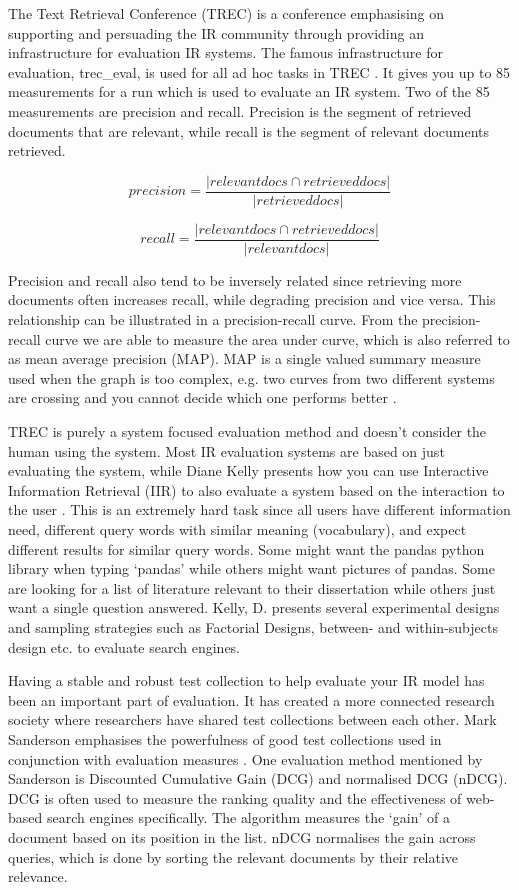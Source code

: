 The Text Retrieval Conference (TREC) is a conference emphasising on supporting and persuading the IR community through providing an infrastructure for evaluation IR systems. The famous infrastructure for evaluation, trec\_eval, is used for all ad hoc tasks in TREC \cite{voorhees:evaluation}. It gives you up to 85 measurements for a run which is used to evaluate an IR system. Two of the 85 measurements are precision and recall. Precision is the segment of retrieved documents that are relevant, while recall is the segment of relevant documents retrieved.

$$ precision = \frac{|{relevant docs} \cap {retrieved docs}|}{|{retrieved docs}|} $$

$$ recall = \frac{|{relevant docs} \cap {retrieved docs}|}{|{relevant docs}|} $$

Precision and recall also tend to be inversely related since retrieving more documents often increases recall, while degrading precision and vice versa\cite{voorhees:evaluation}. This relationship can be illustrated in a precision-recall curve. From the precision-recall curve we are able to measure the area under curve, which is also referred to as mean average precision (MAP). MAP is a single valued summary measure used when the graph is too complex, e.g. two curves from two different systems are crossing and you cannot decide which one performs better \cite{voorhees:evaluation}.

TREC is purely a system focused evaluation method and doesn’t consider the human using the system. Most IR evaluation systems are based on just evaluating the system, while Diane Kelly presents how you can use Interactive Information Retrieval (IIR) to also evaluate a system based on the interaction to the user \cite{kelly:evaluation}. This is an extremely hard task since all users have different information need, different query words with similar meaning (vocabulary), and expect different results for similar query words. Some might want the pandas python library when typing ‘pandas’ while others might want pictures of pandas. Some are looking for a list of literature relevant to their dissertation while others just want a single question answered. Kelly, D. presents several experimental designs and sampling strategies such as Factorial Designs, between- and within-subjects design etc. to evaluate search engines.

Having a stable and robust test collection to help evaluate your IR model has been an important part of evaluation. It has created a more connected research society where researchers have shared test collections between each other. Mark Sanderson emphasises the powerfulness of good test collections used in conjunction with evaluation measures \cite{sanderson:evaluation}. One evaluation method mentioned by Sanderson is Discounted Cumulative Gain (DCG) and normalised DCG (nDCG)\cite{sanderson:evaluation}. DCG is often used to measure the ranking quality and the effectiveness of web-based search engines specifically. The algorithm measures the ‘gain’ of a document based on its position in the list. nDCG normalises the gain across queries, which is done by sorting the relevant documents by their relative relevance.

